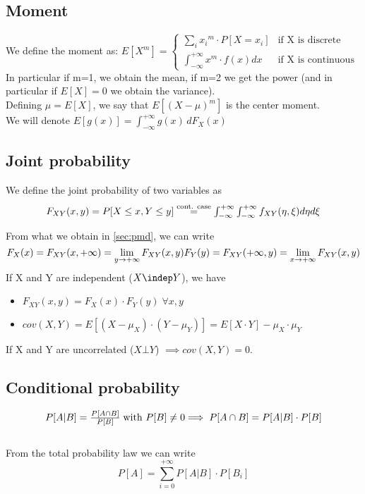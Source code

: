 \subsection{Moment}
We define  the moment as:
$E[X^m]=
\begin{cases}
    \sum\limits_{i} {x{_i}^{m} \cdot P[X=x_i]} & \text{if X is discrete } \\
    \int_{-\infty}^{+\infty} {x^{m} \cdot f(x) dx }  & \text{if X is continuous}
\end{cases}$
In particular if m=1, we obtain the mean, if m=2 we get the power (and in particular if $E[X]=0$ we obtain the variance).\\
Defining $\mu = E[X]$, we say that $E[(X-\mu)^m]$ is the center moment.\\
We will denote $E[g(x)]=\int_{-\infty}^{+\infty} g(x)\, d F_X(x)$

\subsection{Joint probability}
We define the joint probability of two variables as
\begin{equation*}
  $$F_{XY}(x,y)=P[X\le x , Y \le y] \stackrel{\text{cont. case}}{=} \int_{-\infty}^{+\infty}\int_{-\infty}^{+\infty} f_{XY}(\eta,\xi) d\eta d\xi$$
\end{equation*}

From what we obtain in \ref{sec:pmd}, we can write \\
\begin{equation*}
  $$F_X(x)=F_{XY}(x,+\infty)=\lim\limits_{y \to +\infty} F_{XY}(x,y)$$
  $$F_Y(y)=F_{XY}(+\infty,y)=\lim\limits_{x \to +\infty} F_{XY}(x,y)$$
\end{equation*}
If X and Y are independent ($X \indep Y$), we have
\begin{itemize}
  \item $F_{XY}(x,y)=F_X(x)\cdot F_Y(y) \; \forall x,y$
  \item $cov(X,Y) = E[(X - \mu_X)\cdot (Y - \mu_Y)] = E[X \cdot Y]-\mu_X \cdot \mu_Y$
\end{itemize}
If X and Y are uncorrelated ($X \bot Y$) $\implies cov(X,Y)=0$.

\subsection{Conditional probability}
\begin{equation}
  $$P[A | B]= \frac{P[A \cap B]}{P[B]} \; \text{with $P[B]\ne 0$}$$ \\
  $$\implies P[A \cap B ] = P[A | B ]\cdot P[B]$$
\end{equation}\\
From the total probability law we can write\\
$$P[A]= \sum\limits_{i=0}^{+\infty}P[A|B]\cdot P[B_i]$$

